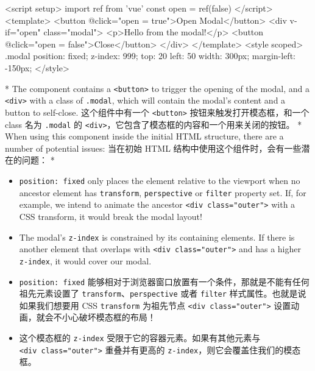 \begin{paracol}{2}
\begin{codeHtml}
<script setup>
import { ref } from 'vue'
const open = ref(false)
</script>
<template>
  <button @click="open = true">Open Modal</button>
  <div v-if="open" class="modal">
    <p>Hello from the modal!</p>
    <button @click="open = false">Close</button>
  </div>
</template>
<style scoped>
.modal {
  position: fixed;
  z-index: 999;
  top: 20%
  left: 50%
  width: 300px;
  margin-left: -150px;
}
</style>
\end{codeHtml}
\switchcolumn[0]*%
The component contains a \texttt{\textless{}button\textgreater{}} to
trigger the opening of the modal, and a
\texttt{\textless{}div\textgreater{}} with a class of \texttt{.modal},
which will contain the modal's content and a button to self-close.
\switchcolumn
这个组件中有一个 \texttt{\textless{}button\textgreater{}}
按钮来触发打开模态框，和一个 class 名为 \texttt{.modal} 的
\texttt{\textless{}div\textgreater{}}，它包含了模态框的内容和一个用来关闭的按钮。
\switchcolumn[0]*%
When using this component inside the initial HTML structure, there are a
number of potential issues:
\switchcolumn
当在初始 HTML 结构中使用这个组件时，会有一些潜在的问题：
\switchcolumn[0]*%
\begin{itemize}
\item
  \texttt{position:\ fixed} only places the element relative to the
  viewport when no ancestor element has \texttt{transform},
  \texttt{perspective} or \texttt{filter} property set. If, for example,
  we intend to animate the ancestor
  \texttt{\textless{}div\ class="outer"\textgreater{}} with a CSS
  transform, it would break the modal layout!
\item
  The modal's \texttt{z-index} is constrained by its containing
  elements. If there is another element that overlaps with
  \texttt{\textless{}div\ class="outer"\textgreater{}} and has a higher
  \texttt{z-index}, it would cover our modal.
\end{itemize}
\switchcolumn
\begin{itemize}
\item
  \texttt{position:\ fixed}
  能够相对于浏览器窗口放置有一个条件，那就是不能有任何祖先元素设置了
  \texttt{transform}、\texttt{perspective} 或者 \texttt{filter}
  样式属性。也就是说如果我们想要用 CSS \texttt{transform} 为祖先节点
  \texttt{\textless{}div\ class="outer"\textgreater{}}
  设置动画，就会不小心破坏模态框的布局！
\item
  这个模态框的 \texttt{z-index} 受限于它的容器元素。如果有其他元素与
  \texttt{\textless{}div\ class="outer"\textgreater{}} 重叠并有更高的
  \texttt{z-index}，则它会覆盖住我们的模态框。

\end{itemize}
\end{paracol}
